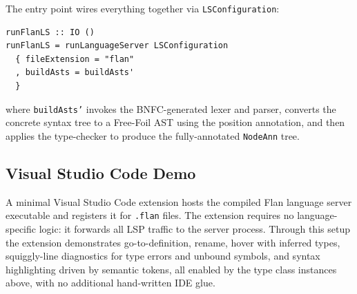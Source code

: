 The entry point wires everything together via \texttt{LSConfiguration}:

\begin{verbatim}
runFlanLS :: IO ()
runFlanLS = runLanguageServer LSConfiguration
  { fileExtension = "flan"
  , buildAsts = buildAsts'
  }
\end{verbatim}

where \texttt{buildAsts'} invokes the BNFC-generated lexer and parser, converts the concrete syntax tree to a Free-Foil AST using the position annotation, and then applies the type-checker to produce the fully-annotated \texttt{NodeAnn} tree.

\subsection{Visual Studio Code Demo}

A minimal Visual Studio Code extension hosts the compiled Flan language server executable and registers it for \texttt{.flan} files.
The extension requires no language-specific logic: it forwards all LSP traffic to the server process.
Through this setup the extension demonstrates go-to-definition, rename, hover with inferred types, squiggly-line diagnostics for type errors and unbound symbols, and syntax highlighting driven by semantic tokens, all enabled by the type class instances above, with no additional hand-written IDE glue.